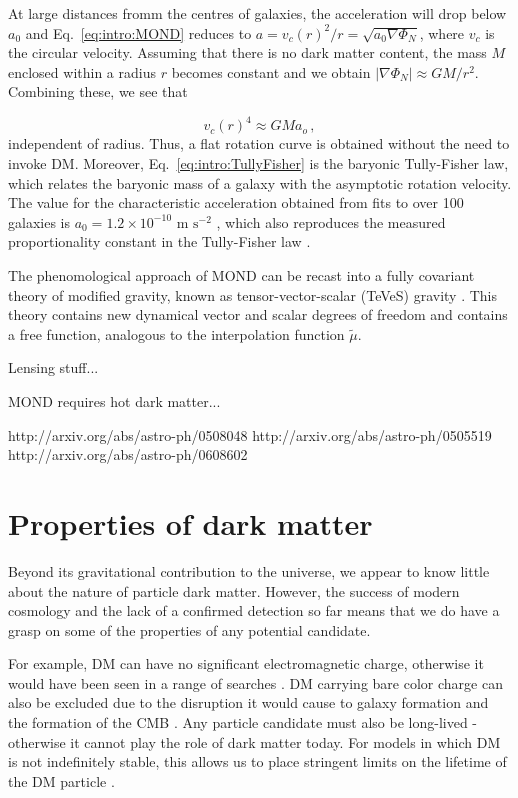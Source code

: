 At large distances fromm the centres of galaxies, the acceleration will drop below $a_0$ and Eq.~\ref{eq:intro:MOND} reduces to $a = v_c(r)^2/r = \sqrt{a_0 \nabla \Phi_N}$, where $v_c$ is the circular velocity. Assuming that there is no dark matter content, the mass $M$ enclosed within a radius $r$ becomes constant and we obtain $|\nabla \Phi_N| \approx GM/r^2$. Combining these, we see that

\begin{equation}
\label{eq:intro:TullyFisher}
v_c(r)^4 \approx GM a_o\,,
\end{equation}
independent of radius. Thus, a flat rotation curve is obtained without the need to invoke DM. Moreover, Eq.~\ref{eq:intro:TullyFisher} is the baryonic Tully-Fisher law, which relates the baryonic mass of a galaxy with the asymptotic rotation velocity. The value for the characteristic acceleration obtained from fits to over 100 galaxies is $a_0 = 1.2 \times 10^{-10} \textrm{ m s}^{-2}$ \cite{Begeman:1991}, which also reproduces the measured proportionality constant in the Tully-Fisher law \cite{McGaugh:2005}.

The phenomological approach of MOND can be recast into a fully covariant theory of modified gravity, known as tensor-vector-scalar (TeVeS) gravity \cite{Bekenstein:2005}. This theory contains new dynamical vector and scalar degrees of freedom and contains a free function, analogous to the interpolation function $\tilde{\mu}$.

\cite{Skordis:2006}
\cite{Chiu:2005}
\cite{Zhao:2006} Lensing stuff...

MOND requires hot dark matter...


http://arxiv.org/abs/astro-ph/0508048
http://arxiv.org/abs/astro-ph/0505519
http://arxiv.org/abs/astro-ph/0608602

\section{Properties of dark matter}
\label{intro:sec:properties}

Beyond its gravitational contribution to the universe, we appear to know little about the nature of particle dark matter. However, the success of modern cosmology and the lack of a confirmed detection so far means that we do have a grasp on some of the properties of any potential candidate.

For example, DM can have no significant electromagnetic charge, otherwise it would have been seen in a range of searches \cite{Kudo:2001,Perl:2001,Gninenko:2007,Melchiorri:2007}. DM carrying bare color charge can also be excluded due to the disruption it would cause to galaxy formation \cite{Natarajan:2002} and the formation of the CMB \cite{Chen:2002}. Any particle candidate must also be long-lived - otherwise it cannot play the role of dark matter today. For models in which DM is not indefinitely stable, this allows us to place stringent limits on the lifetime of the DM particle \cite{Amigo:2009,Bell:2010}. %

